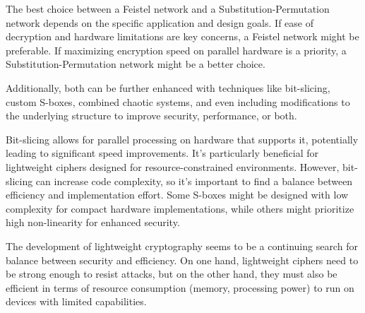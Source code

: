 \documentclass[conference]{IEEEtran}
\begin{document}
The best choice between a Feistel network and a Substitution-Permutation network depends on the specific application and design goals. If ease of decryption and hardware limitations are key concerns, a Feistel network might be preferable. If maximizing encryption speed on parallel hardware is a priority, a Substitution-Permutation network might be a better choice.

Additionally, both can be further enhanced with techniques like bit-slicing, custom S-boxes, combined chaotic systems, and even including modifications to the underlying structure to improve security, performance, or both.

Bit-slicing allows for parallel processing on hardware that supports it, potentially leading to significant speed improvements. It's particularly beneficial for lightweight ciphers designed for resource-constrained environments. However, bit-slicing can increase code complexity, so it's important to find a balance between efficiency and implementation effort. Some S-boxes might be designed with low complexity for compact hardware implementations, while others might prioritize high non-linearity for enhanced security.

The development of lightweight cryptography seems to be a continuing search for balance between security and efficiency. On one hand, lightweight ciphers need to be strong enough to resist attacks, but on the other hand, they must also be efficient in terms of resource consumption (memory, processing power) to run on devices with limited capabilities.




\vspace{12pt}
\end{document}

